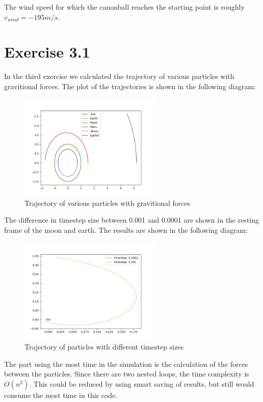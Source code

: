 \documentclass[a4paper,11pt,bibtotoc]{scrartcl}
\begin{document}
The wind speed for which the canonball reaches the starting point is roughly $v_{wind} = -195m/s$.

\section{Exercise 3.1}

In the third exercise we calculated the trajectory of various particles with gravitional forces.
The plot of the trajectories is shown in the following diagram:
\begin{figure}[!htbp]
	\centering
	\includegraphics[width=0.6\textwidth]{ex_3_1_1.png}
	\caption{Trajectory of various particles with gravitional forces}
	\label{fig:ex_3_1_1}
\end{figure}


The difference in timestep size between 0.001 and 0.0001 are shown in the resting frame of the moon and earth. The results are shown in the following diagram:
\begin{figure}[!htbp]
	\centering
	\includegraphics[width=0.6\textwidth]{ex_3_1_2.png}
	\caption{Trajectory of particles with different timestep sizes}
	\label{fig:ex_3_1_2}
\end{figure}


The part using the most time in the simulation is the calculation of the forces between the particles. Since there are two nested loops, the time complexity is $O(n^2)$.
This could be reduced by using smart saving of results, but still would consume the most time in this code.
\end{document}
